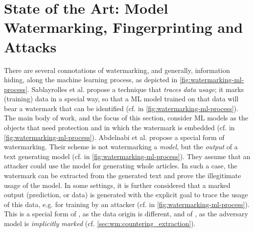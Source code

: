 \chapter{State of the Art: Model Watermarking, Fingerprinting and Attacks}
\label{ch:sota}



There are several connotations of watermarking, and generally, information hiding, along the machine learning process, as depicted in \cref{fig:watermarking-ml-process}.
Sablayrolles et al. \cite{sablayrolles_radioactive_2020} propose a technique that \textit{traces data usage}; it marks (training) data in a special way, so that a ML model trained on that data will bear a watermark that can be identified  (cf.  in \cref{fig:watermarking-ml-process}).
The main body of work, and the focus of this section, consider ML models as the objects that need protection and in which the watermark is embedded  (cf.  in \cref{fig:watermarking-ml-process}).
Abdelnabi et al. \cite{abdelnabi_adversarial_2020} propose a special form of watermarking. Their scheme is not watermarking a \textit{model}, but the \textit{output} of a text generating model (cf.  in \cref{fig:watermarking-ml-process}). They assume that an attacker could use the model for generating whole articles. In such a case, the watermark can be extracted from the generated text and prove the illegitimate usage of the model.
In some settings, it is further considered that a marked output (prediction, or data) is generated with the explicit goal to trace the usage of this data, e.g. for training by an attacker (cf.  in \cref{fig:watermarking-ml-process}). This is a special form of , as the data origin is different, and of , as the adversary model is \textit{implicitly marked} (cf. %
\cref{sec:wm:countering_extraction}).

